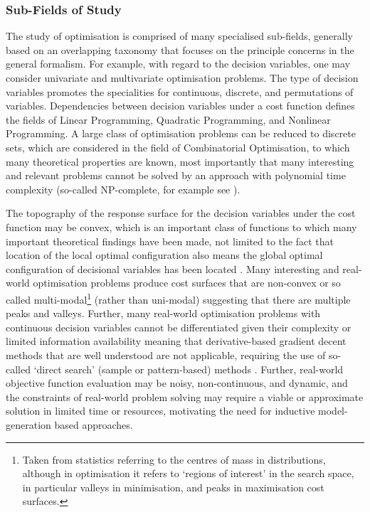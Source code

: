 \documentclass[a4paper, 11pt]{article}
\begin{document}
\subsubsection{Sub-Fields of Study}
The study of optimisation is comprised of many specialised sub-fields, generally based on an overlapping taxonomy that focuses on the principle concerns in the general formalism. 
For example, with regard to the decision variables, one may consider univariate and multivariate optimisation problems. The type of decision variables promotes the specialities for continuous, discrete, and permutations of variables. Dependencies between decision variables under a cost function defines the fields of Linear Programming, Quadratic Programming, and Nonlinear Programming. A large class of optimisation problems can be reduced to discrete sets, which are considered in the field of Combinatorial Optimisation, to which many theoretical properties are known, most importantly that many interesting and relevant problems cannot be solved by an approach with polynomial time complexity (so-called NP-complete, for example see \cite{Papadimitriou1998}).

The topography of the response surface for the decision variables under the cost function may be convex, which is an important class of functions to which many important theoretical findings have been made, not limited to the fact that location of the local optimal configuration also means the global optimal configuration of decisional variables has been located \cite{Boyd2004}. Many interesting and real-world optimisation problems produce cost surfaces that are non-convex or so called multi-modal\footnote{Taken from statistics referring to the centres of mass in distributions, although in optimisation it refers to `regions of interest' in the search space, in particular valleys in minimisation, and peaks in maximisation cost surfaces.} (rather than uni-modal) suggesting that there are multiple peaks and valleys. Further, many real-world optimisation problems with continuous decision variables cannot be differentiated given their complexity or limited information availability meaning that derivative-based gradient decent methods that are well understood are not applicable, requiring the use of so-called `direct search' (sample or pattern-based) methods \cite{Lewis2000}. Further, real-world objective function evaluation may be noisy, non-continuous, and dynamic, and the constraints of real-world problem solving may require a viable or approximate solution in limited time or resources, motivating the need for inductive model-generation based approaches.
\end{document}
